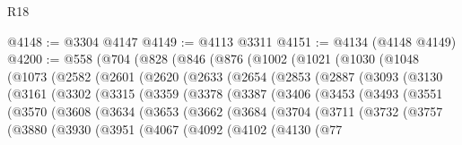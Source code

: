 \begin{lexlean}{R18}
\begin{coremodule}
@4148 := @3304 @4147
@4149 := @4113 @3311
@4151 := @4134 (@4148 @4149)
@4200 := @558
    (@704
      (@828
        (@846
          (@876
            (@1002
              (@1021
                (@1030
                  (@1048
                    (@1073
                      (@2582
                        (@2601
                          (@2620
                            (@2633
                              (@2654
                                (@2853
                                  (@2887
                                    (@3093
                                      (@3130
                                        (@3161
                                          (@3302
                                            (@3315
                                              (@3359
                                                (@3378
                                                  (@3387
                                                    (@3406
                                                      (@3453
                                                        (@3493
                                                          (@3551
                                                            (@3570
                                                              (@3608
                                                                (@3634
                                                                  (@3653
                                                                    (@3662
                                                                      (@3684
                                                                        (@3704
                                                                          (@3711
                                                                            (@3732
                                                                              (@3757
                                                                                (@3880
                                                                                  (@3930
                                                                                    (@3951
                                                                                      (@4067
                                                                                        (@4092
                                                                                          (@4102
                                                                                            (@4130
                                                                                              (@77

\end{coremodule}
\end{lexlean}
